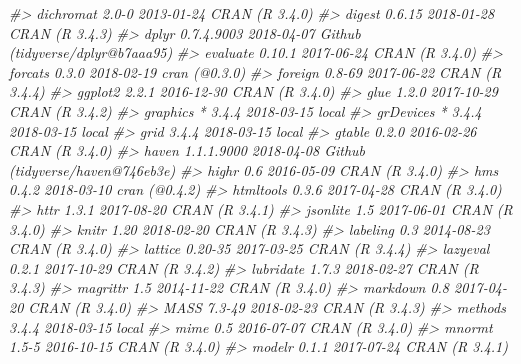 \documentclass[]{book}
\newenvironment{Shaded}{\begin{snugshade}}{\end{snugshade}}
\newcommand{\CommentTok}[1]{\textcolor[rgb]{0.56,0.35,0.01}{\textit{#1}}}
\theoremstyle{definition}
\theoremstyle{definition}
\theoremstyle{definition}
\theoremstyle{remark}
\begin{document}
\begin{Shaded}
\begin{Highlighting}[]
\CommentTok{#>  dichromat      2.0-0      2013-01-24 CRAN (R 3.4.0)                  }
\CommentTok{#>  digest         0.6.15     2018-01-28 CRAN (R 3.4.3)                  }
\CommentTok{#>  dplyr          0.7.4.9003 2018-04-07 Github (tidyverse/dplyr@b7aaa95)}
\CommentTok{#>  evaluate       0.10.1     2017-06-24 CRAN (R 3.4.0)                  }
\CommentTok{#>  forcats        0.3.0      2018-02-19 cran (@0.3.0)                   }
\CommentTok{#>  foreign        0.8-69     2017-06-22 CRAN (R 3.4.4)                  }
\CommentTok{#>  ggplot2        2.2.1      2016-12-30 CRAN (R 3.4.0)                  }
\CommentTok{#>  glue           1.2.0      2017-10-29 CRAN (R 3.4.2)                  }
\CommentTok{#>  graphics     * 3.4.4      2018-03-15 local                           }
\CommentTok{#>  grDevices    * 3.4.4      2018-03-15 local                           }
\CommentTok{#>  grid           3.4.4      2018-03-15 local                           }
\CommentTok{#>  gtable         0.2.0      2016-02-26 CRAN (R 3.4.0)                  }
\CommentTok{#>  haven          1.1.1.9000 2018-04-08 Github (tidyverse/haven@746eb3e)}
\CommentTok{#>  highr          0.6        2016-05-09 CRAN (R 3.4.0)                  }
\CommentTok{#>  hms            0.4.2      2018-03-10 cran (@0.4.2)                   }
\CommentTok{#>  htmltools      0.3.6      2017-04-28 CRAN (R 3.4.0)                  }
\CommentTok{#>  httr           1.3.1      2017-08-20 CRAN (R 3.4.1)                  }
\CommentTok{#>  jsonlite       1.5        2017-06-01 CRAN (R 3.4.0)                  }
\CommentTok{#>  knitr          1.20       2018-02-20 CRAN (R 3.4.3)                  }
\CommentTok{#>  labeling       0.3        2014-08-23 CRAN (R 3.4.0)                  }
\CommentTok{#>  lattice        0.20-35    2017-03-25 CRAN (R 3.4.4)                  }
\CommentTok{#>  lazyeval       0.2.1      2017-10-29 CRAN (R 3.4.2)                  }
\CommentTok{#>  lubridate      1.7.3      2018-02-27 CRAN (R 3.4.3)                  }
\CommentTok{#>  magrittr       1.5        2014-11-22 CRAN (R 3.4.0)                  }
\CommentTok{#>  markdown       0.8        2017-04-20 CRAN (R 3.4.0)                  }
\CommentTok{#>  MASS           7.3-49     2018-02-23 CRAN (R 3.4.3)                  }
\CommentTok{#>  methods        3.4.4      2018-03-15 local                           }
\CommentTok{#>  mime           0.5        2016-07-07 CRAN (R 3.4.0)                  }
\CommentTok{#>  mnormt         1.5-5      2016-10-15 CRAN (R 3.4.0)                  }
\CommentTok{#>  modelr         0.1.1      2017-07-24 CRAN (R 3.4.1)                  }

\end{Highlighting}
\end{Shaded}
\end{document}

